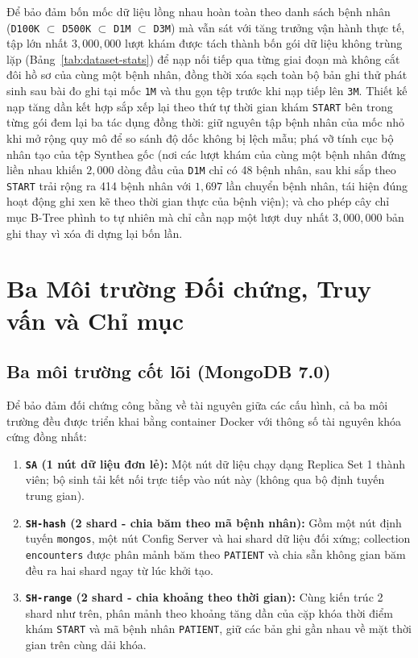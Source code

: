 Để bảo đảm bốn mốc dữ liệu lồng nhau hoàn toàn theo danh sách bệnh nhân (\texttt{D100K} $\subset$ \texttt{D500K} $\subset$ \texttt{D1M} $\subset$ \texttt{D3M}) mà vẫn sát với tăng trưởng vận hành thực tế, tập lớn nhất $3{,}000{,}000$ lượt khám được tách thành bốn gói dữ liệu không trùng lặp (Bảng~\ref{tab:dataset-stats}) để nạp nối tiếp qua từng giai đoạn mà không cắt đôi hồ sơ của cùng một bệnh nhân, đồng thời xóa sạch toàn bộ bản ghi thử phát sinh sau bài đo ghi tại mốc \texttt{1M} và thu gọn tệp trước khi nạp tiếp lên \texttt{3M}. Thiết kế nạp tăng dần kết hợp sắp xếp lại theo thứ tự thời gian khám \texttt{START} bên trong từng gói đem lại ba tác dụng đồng thời: giữ nguyên tập bệnh nhân của mốc nhỏ khi mở rộng quy mô để so sánh độ dốc không bị lệch mẫu; phá vỡ tính cục bộ nhân tạo của tệp Synthea gốc (nơi các lượt khám của cùng một bệnh nhân đứng liền nhau khiến $2{,}000$ dòng đầu của \texttt{D1M} chỉ có 48 bệnh nhân, sau khi sắp theo \texttt{START} trải rộng ra 414 bệnh nhân với $1{,}697$ lần chuyển bệnh nhân, tái hiện đúng hoạt động ghi xen kẽ theo thời gian thực của bệnh viện); và cho phép cây chỉ mục B-Tree phình to tự nhiên mà chỉ cần nạp một lượt duy nhất $3{,}000{,}000$ bản ghi thay vì xóa đi dựng lại bốn lần.
\FloatBarrier

\section{Ba Môi trường Đối chứng, Truy vấn và Chỉ mục}

\subsection{Ba môi trường cốt lõi (MongoDB 7.0)}

Để bảo đảm đối chứng công bằng về tài nguyên giữa các cấu hình, cả ba môi trường đều được triển khai bằng container Docker với thông số tài nguyên khóa cứng đồng nhất:

\begin{enumerate}[leftmargin=0.8cm, itemsep=4pt]
  \item \textbf{\texttt{SA} (1 nút dữ liệu đơn lẻ):} Một nút dữ liệu chạy dạng Replica Set 1 thành viên; bộ sinh tải kết nối trực tiếp vào nút này (không qua bộ định tuyến trung gian).
  \item \textbf{\texttt{SH-hash} (2 shard - chia băm theo mã bệnh nhân):} Gồm một nút định tuyến \texttt{mongos}, một nút Config Server và hai shard dữ liệu đối xứng; collection \texttt{encounters} được phân mảnh băm theo \texttt{PATIENT} và chia sẵn không gian băm đều ra hai shard ngay từ lúc khởi tạo.
  \item \textbf{\texttt{SH-range} (2 shard - chia khoảng theo thời gian):} Cùng kiến trúc 2 shard như trên, phân mảnh theo khoảng tăng dần của cặp khóa thời điểm khám \texttt{START} và mã bệnh nhân \texttt{PATIENT}, giữ các bản ghi gần nhau về mặt thời gian trên cùng dải khóa.
\end{enumerate}

